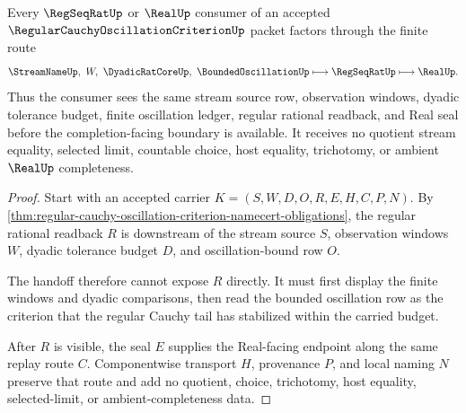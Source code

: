 \begin{theorem}
\label{thm:regular-cauchy-oscillation-criterion-regseqrat-handoff}
Every $\RegSeqRatUp$ or $\RealUp$ consumer of an accepted $\RegularCauchyOscillationCriterionUp$ packet factors through the finite route
$$
\StreamNameUp,\ W,\ \DyadicRatCoreUp,\ \BoundedOscillationUp \longmapsto \RegSeqRatUp \longmapsto \RealUp .
$$
Thus the consumer sees the same stream source row, observation windows, dyadic tolerance budget, finite oscillation ledger, regular rational readback, and Real seal before the completion-facing boundary is available. It receives no quotient stream equality, selected limit, countable choice, host equality, trichotomy, or ambient $\RealUp$ completeness.
\end{theorem}
\begin{proof}
Start with an accepted carrier $K=(S,W,D,O,R,E,H,C,P,N)$. By \autoref{thm:regular-cauchy-oscillation-criterion-namecert-obligations}, the regular rational readback $R$ is downstream of the stream source $S$, observation windows $W$, dyadic tolerance budget $D$, and oscillation-bound row $O$.

The handoff therefore cannot expose $R$ directly. It must first display the finite windows and dyadic comparisons, then read the bounded oscillation row as the criterion that the regular Cauchy tail has stabilized within the carried budget.

After $R$ is visible, the seal $E$ supplies the Real-facing endpoint along the same replay route $C$. Componentwise transport $H$, provenance $P$, and local naming $N$ preserve that route and add no quotient, choice, trichotomy, host equality, selected-limit, or ambient-completeness data.
\end{proof}


